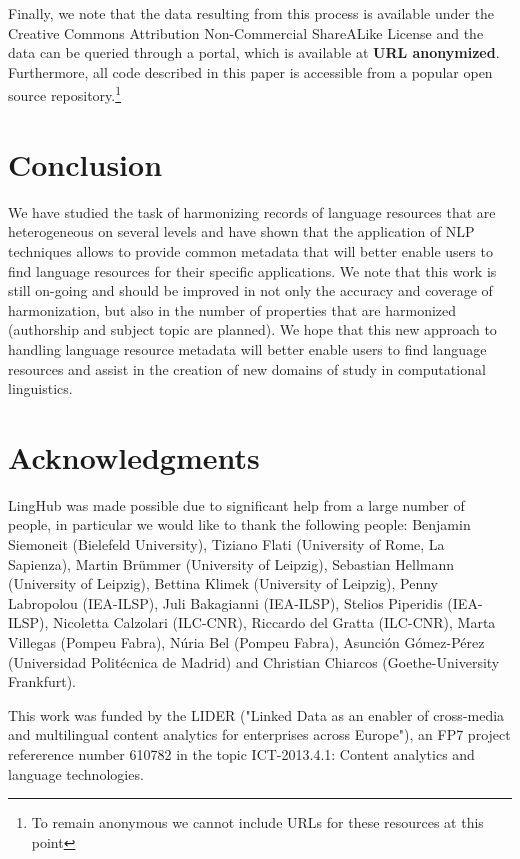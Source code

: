 \documentclass[11pt]{article}
\begin{document}
Finally, we note that the data resulting from this process is available under
the Creative Commons Attribution Non-Commercial ShareALike License and the data
can be queried through a portal, which is available at \textbf{URL anonymized}.
Furthermore, all code described in this paper is accessible from a popular open
source repository.\footnote{To remain anonymous we cannot include URLs for these
resources at this point}

\section{Conclusion}

We have studied the task of harmonizing records of language resources that are
heterogeneous on several levels and have shown that the application of NLP
techniques allows to provide common metadata that will better enable users to
find language resources for their specific applications. We note that this work
is still on-going and should be improved in not only the accuracy and coverage
of harmonization, but also in the number of properties that are harmonized
(authorship and subject topic are planned). We hope that this new approach to
handling language resource metadata will better enable users to find language
resources and assist in the creation of new domains of study in computational
linguistics.

\section*{Acknowledgments}

LingHub was made possible due to significant help from a large number of
people, in particular we would like to thank the following people: Benjamin
Siemoneit (Bielefeld University), Tiziano Flati (University of Rome, La
Sapienza), Martin Br\"ummer (University of Leipzig), Sebastian Hellmann
(University of Leipzig), Bettina Klimek (University of Leipzig), Penny
Labropolou (IEA-ILSP), Juli Bakagianni (IEA-ILSP), Stelios Piperidis
(IEA-ILSP), Nicoletta Calzolari (ILC-CNR), Riccardo del Gratta (ILC-CNR), Marta
Villegas (Pompeu Fabra), N\'uria Bel (Pompeu Fabra), Asunci\'on G\'omez-P\'erez 
(Universidad Polit\'ecnica de Madrid) and Christian Chiarcos
(Goethe-University Frankfurt).
%

This work was funded by the LIDER ("Linked Data as an enabler of
cross-media and multilingual content analytics for enterprises across Europe"),
an FP7 project refererence number 610782 in the topic ICT-2013.4.1: Content
analytics and language technologies.



\end{document}
